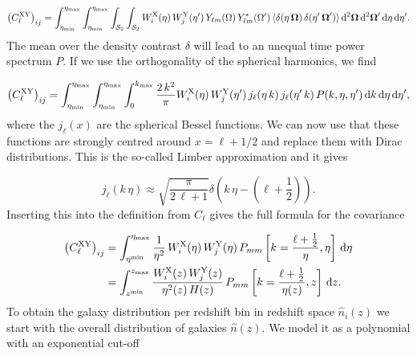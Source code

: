 \documentclass[../main.tex]{subfiles}
\begin{document}
\begin{align}
    \label{eq:covariance_notwopoint}
    \left(C^\mathrm{XY}_{\ell}\right)_{ij}= \int_{\eta_\mathrm{min}}^{\eta_\mathrm{max}} \int_{\eta_\mathrm{min}}^{\eta_\mathrm{max}} \int_{\mathcal{S}_2} \int_{\mathcal{S}_2} W_i^\mathrm{X}(\eta)\, W_j^\mathrm{Y}(\eta')\, Y_{\ell m}(\Omega) \, Y^*_{\ell m}(\Omega')\, \langle \delta(\eta\,\boldsymbol{\Omega})\,\delta(\eta'\,\boldsymbol{\Omega}') \rangle\, \mathrm{d}^2 \boldsymbol{\Omega} \, \mathrm{d}^2 \boldsymbol{\Omega}' \,\mathrm{d} \eta\, \mathrm{d} \eta'.
\end{align}
The mean over the density contrast $\delta$ will lead to an unequal time power spectrum $P$. If we use the orthogonality of the spherical harmonics, we find 

\begin{equation*}
    \left(C^\mathrm{XY}_{\ell}\right)_{ij} = \int_{\eta_\mathrm{min}}^{\eta_\mathrm{max}} \int_{{\eta_\mathrm{min}}}^{\eta_\mathrm{max}} \int_0^{k_\mathrm{max}} \frac{2\,k^2}{\pi} W_i^\mathrm{X}(\eta) \,  W_j^\mathrm{Y}(\eta') \, j_\ell(\eta\,k ) \, j_\ell(\eta' \,k) \, P(k,\eta,\eta') \, \mathrm{d} k \, \mathrm{d} \eta \, \mathrm{d} \eta',
\end{equation*} 
where the $j_\ell(x)$ are the spherical Bessel functions. We can now use that these functions are strongly centred around $x=\ell+1/2$ and replace them with Dirac distributions. This is the so-called Limber approximation and it gives 

\begin{equation}
    j_\ell(k\,\eta) \approx \sqrt{\frac{\pi}{2\,\ell+1}} \delta\left(k\,\eta - (\ell+ \frac{1}{2})\right).
\end{equation}
Inserting this into the definition from $C_{\ell}$ gives the full formula for the covariance 

\begin{align}
    \left(C^\mathrm{XY}_{\ell}\right)_{ij} &= \int_{\eta^\mathrm{min}}^{\eta_\mathrm{max}} \frac{1}{\eta^2}\,W_i^\mathrm{X}(\eta) \,  W_j^\mathrm{Y}(\eta)\,P_{mm}\left[k=\frac{\ell+\frac{1}{2}}{\eta},\eta\right]\, \mathrm{d}\eta \nonumber \\
    \label{eq:covariance_from_pmm}
    &= \int_{z^\mathrm{min}}^{z_\mathrm{max}} \frac{W_i^\mathrm{X}(z) \,  W_j^\mathrm{Y}(z)}{\eta^2(z)\,H(z)}\,P_{mm}\left[k=\frac{\ell+\frac{1}{2}}{\eta(z)},z\right]\, \mathrm{d} z.
\end{align}
 To obtain the galaxy distribution per redshift bin in redshift space $\hat{n}_i(z)$ we start with the overall distribution of galaxies $\hat{n}(z)$. We model it as a polynomial with an exponential cut-off
 
\end{document}
